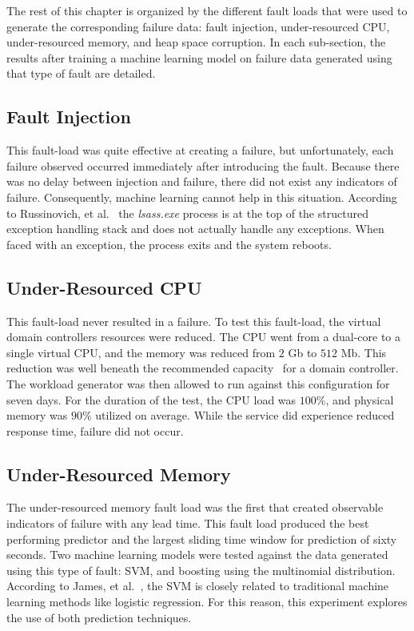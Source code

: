 The rest of this chapter is organized by the different fault loads that were
used to generate the corresponding failure data: fault injection,
under-resourced \ac{CPU}, under-resourced memory, and heap space corruption.
In each sub-section, the results after training a machine learning model on
failure data generated using that type of fault are detailed.

\subsection{Fault Injection}
This fault-load was quite effective at creating a failure, but unfortunately,
each failure observed occurred immediately after introducing the fault.
Because there was no delay between injection and failure, there did not exist
any indicators of failure.  Consequently, machine learning cannot help in this
situation.  According to Russinovich, et al.~\cite{russinovich2009} the
\emph{lsass.exe} process is at the top of the structured exception handling
stack and does not actually handle any exceptions.  When faced with an
exception, the process exits and the system reboots.

\subsection{Under-Resourced \ac{CPU}}
This fault-load never resulted in a failure.  To test this fault-load, the
virtual domain controllers resources were reduced.  The \ac{CPU} went from a
dual-core to a single virtual CPU, and the memory was reduced from $2$ Gb to
$512$ Mb.  This reduction was well beneath the recommended
capacity~\cite{mak12} for a domain controller.  The workload generator was then
allowed to run against this configuration for seven days.  For the duration of
the test, the \ac{CPU} load was $100\%$, and physical memory was $90\%$
utilized on average.  While the service did experience reduced response time,
failure did not occur.

\subsection{Under-Resourced Memory}
The under-resourced memory fault load was the first that created observable
indicators of failure with any lead time.  This fault load produced the best
performing predictor and the largest sliding time window for prediction of
sixty seconds.  Two machine learning models were tested against the data
generated using this type of fault: \ac{SVM}, and boosting using the
multinomial distribution.  According to James, et al.~\cite{islr}, the \ac{SVM}
is closely related to traditional machine learning methods like logistic
regression.  For this reason, this experiment explores the use of both
prediction techniques.

